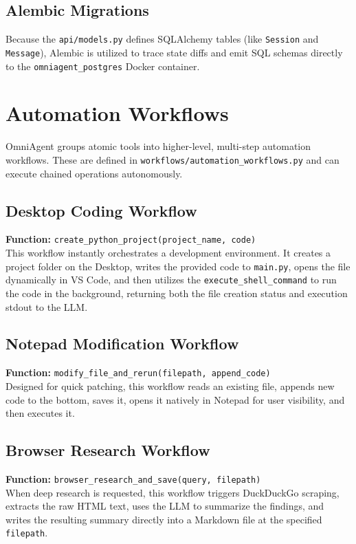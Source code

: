 \documentclass[11pt,a4paper]{report}
\begin{document}
\section{Alembic Migrations}
Because the \texttt{api/models.py} defines SQLAlchemy tables (like \texttt{Session} and \texttt{Message}), Alembic is utilized to trace state diffs and emit SQL schemas directly to the \texttt{omniagent\_postgres} Docker container.

\chapter{Automation Workflows}
OmniAgent groups atomic tools into higher-level, multi-step automation workflows. These are defined in \texttt{workflows/automation\_workflows.py} and can execute chained operations autonomously.

\section{Desktop Coding Workflow}
\textbf{Function:} \texttt{create\_python\_project(project\_name, code)}\\
This workflow instantly orchestrates a development environment. It creates a project folder on the Desktop, writes the provided code to \texttt{main.py}, opens the file dynamically in VS Code, and then utilizes the \texttt{execute\_shell\_command} to run the code in the background, returning both the file creation status and execution stdout to the LLM.

\section{Notepad Modification Workflow}
\textbf{Function:} \texttt{modify\_file\_and\_rerun(filepath, append\_code)}\\
Designed for quick patching, this workflow reads an existing file, appends new code to the bottom, saves it, opens it natively in Notepad for user visibility, and then executes it.

\section{Browser Research Workflow}
\textbf{Function:} \texttt{browser\_research\_and\_save(query, filepath)}\\
When deep research is requested, this workflow triggers DuckDuckGo scraping, extracts the raw HTML text, uses the LLM to summarize the findings, and writes the resulting summary directly into a Markdown file at the specified \texttt{filepath}.
\end{document}
